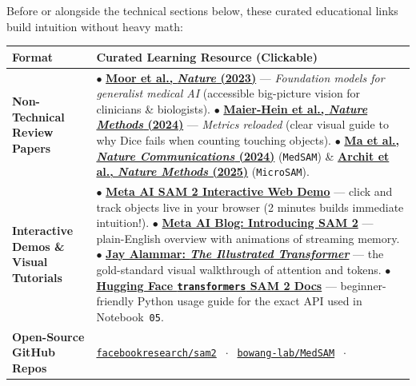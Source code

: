 \documentclass[10.5pt,a4paper]{article}
\begin{document}
Before or alongside the technical sections below, these curated educational links build intuition without heavy math:

\begin{table}[H]
\centering
\scriptsize
\renewcommand{\arraystretch}{1.20}
\begin{tabularx}{\textwidth}{L{2.55cm} Y}
\toprule
{}
\textbf{Format} & \textbf{Curated Learning Resource (Clickable)} \\
\midrule
\textbf{Non-Technical Review Papers} &
$\bullet$ \href{https://doi.org/10.1038/s41586-023-05881-4}{\textbf{Moor et al., \emph{Nature} (2023)}} --- \emph{Foundation models for generalist medical AI} (accessible big-picture vision for clinicians \& biologists). \newline
$\bullet$ \href{https://doi.org/10.1038/s41592-023-02151-z}{\textbf{Maier-Hein et al., \emph{Nature Methods} (2024)}} --- \emph{Metrics reloaded} (clear visual guide to why Dice fails when counting touching objects). \newline
$\bullet$ \href{https://doi.org/10.1038/s41467-024-44824-z}{\textbf{Ma et al., \emph{Nature Communications} (2024)}} (\texttt{MedSAM}) \& \href{https://doi.org/10.1038/s41592-024-02580-4}{\textbf{Archit et al., \emph{Nature Methods} (2025)}} (\texttt{MicroSAM}). \\
\textbf{Interactive Demos \& Visual Tutorials} &
$\bullet$ \href{https://sam2.metademolab.com/}{\textbf{Meta AI SAM 2 Interactive Web Demo}} --- click and track objects live in your browser (2 minutes builds immediate intuition!). \newline
$\bullet$ \href{https://ai.meta.com/blog/segment-anything-model-2/}{\textbf{Meta AI Blog: Introducing SAM 2}} --- plain-English overview with animations of streaming memory. \newline
$\bullet$ \href{https://jalammar.github.io/illustrated-transformer/}{\textbf{Jay Alammar: \emph{The Illustrated Transformer}}} --- the gold-standard visual walkthrough of attention and tokens. \newline
$\bullet$ \href{https://huggingface.co/docs/transformers/model_doc/sam2}{\textbf{Hugging Face \texttt{transformers} SAM 2 Docs}} --- beginner-friendly Python usage guide for the exact API used in Notebook~\texttt{05}. \\
\textbf{Open-Source GitHub Repos} &
\href{https://github.com/facebookresearch/sam2}{\texttt{facebookresearch/sam2}} $\;\cdot\;$
\href{https://github.com/bowang-lab/MedSAM}{\texttt{bowang-lab/MedSAM}} $\;\cdot\;$

\end{tabularx}
\end{table}
\end{document}
